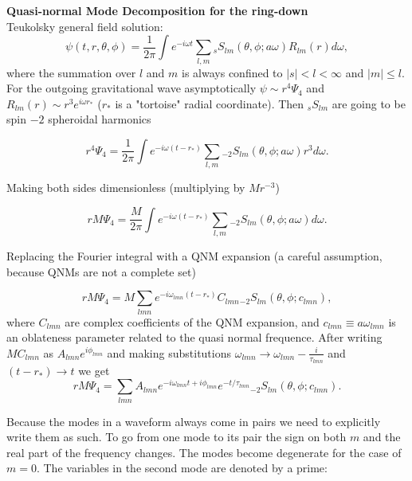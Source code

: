 \documentclass[11pt]{article}
\begin{document}
\noindent
{\large\bf Quasi-normal Mode Decomposition for the ring-down} \\

Teukolsky general field solution:
\begin{equation}
\psi(t,r,\theta,\phi) = \frac{1}{2\pi} \int {e^{-i\omega t} \sum_{l,m} {}_sS_{lm}(\theta, \phi ; a\omega )R_{lm}(r) d\omega },
\end{equation}
where the summation over $l$ and $m$ is always confined to $|s|< l < \infty$ and $|m| \leq l$. For the outgoing gravitational wave asymptotically $\psi \sim r^4\Psi_4$ and $R_{lm}(r) \sim r^3e^{i\omega r_*}$ ($r_*$ is a "tortoise" radial coordinate). Then ${}_sS_{lm}$ are going to be spin $\minus 2$ spheroidal harmonics

\begin{equation}
r^4\Psi_4 = \frac{1}{2\pi} \int {e^{-i\omega (t-r_*)} \sum_{l,m} {}_{\minus 2}S_{lm}(\theta, \phi ; a\omega) r^3 d\omega }.
\end{equation}

\noindent
Making both sides dimensionless (multiplying by $Mr^{-3}$)

\begin{equation}
rM\Psi_4 = \frac{M}{2\pi} \int {e^{-i\omega (t-r_*)} \sum_{l,m} {}_{\minus 2}S_{lm}(\theta, \phi ; a\omega) d\omega }.
\end{equation}

\noindent
Replacing the Fourier integral with a QNM expansion (a careful assumption, because QNMs are not a complete set)

\begin{equation}
rM\Psi_4 = M \sum_{lmn}e^{-i\omega_{lmn} (t-r_*)} C_{lmn} {}_{\minus 2}S_{lm}(\theta,\phi ; c_{lmn}), 
\end{equation}
where $C_{lmn}$ are complex coefficients of the QNM expansion, and $c_{lmn} \equiv a\omega_{lmn}$ is an oblateness parameter related to the quasi normal frequence. After writing $MC_{lmn}$ as $A_{lmn}e^{i\phi_{lmn}}$ and making substitutions $\omega_{lmn} \rightarrow  \omega_{lmn} - \frac{i}{\tau_{lmn}}$ and $(t-r_*) \rightarrow t$ we get
\begin{equation}
rM\Psi_4 = \sum_{lmn} A_{lmn} e^{-i\omega_{lmn}t+i\phi_{lmn}}e^{-t/\tau_{lmn}} {}_{\minus 2}S_{lm}(\theta,\phi ; c_{lmn}).
\end{equation}

\noindent
Because the modes in a waveform always come in pairs we need to explicitly write them as such. To go from one mode to its pair the sign on both $m$ and the real part of the frequency changes. The modes become degenerate for the case of $m=0$. The variables in the second mode are denoted by a prime:
\end{document}
